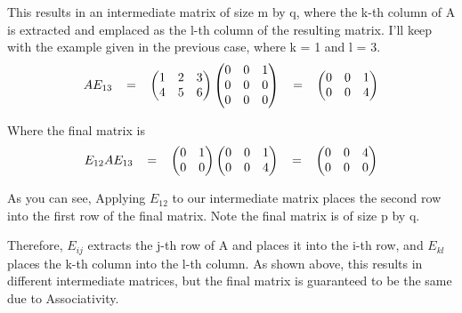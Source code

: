 \documentclass[12pt]{article}
\newcommand{\hop}{\vspace{1mm}}
\begin{document}
\begin{enumerate}[leftmargin=\labelsep]
\begin{enumerate}
\begin{enumerate}
    \hop
    This results in an intermediate matrix of size m by q, where the k-th column of A is extracted and emplaced as the l-th column of the resulting matrix. I'll keep with the example given in the previous case, where k = 1 and l = 3.
    \[
    AE_{13}
    \hspace{3mm}
    =
    \hspace{3mm}
    \begin{pmatrix}
        1   &2  &3  \\
        4   &5  &6
    \end{pmatrix}
    \begin{pmatrix}
        0   &0  &1  \\
        0   &0  &0  \\
        0   &0  &0
    \end{pmatrix}
    \hspace{3mm}
    =
    \hspace{3mm}
    \begin{pmatrix}
        0   &0  &1  \\
        0   &0  &4
    \end{pmatrix}
    \]

    \hop
    Where the final matrix is 
    \[
    E_{12}AE_{13}
    \hspace{3mm}
    =
    \hspace{3mm}
    \begin{pmatrix}
        0   &1  \\
        0   &0
    \end{pmatrix}
    \begin{pmatrix}
        0   &0  &1  \\
        0   &0  &4
    \end{pmatrix}
    \hspace{3mm}
    =
    \hspace{3mm}
    \begin{pmatrix}
        0   &0  &4  \\
        0   &0  &0
    \end{pmatrix}
    \]

    \hop
    As you can see, Applying $E_{12}$ to our intermediate matrix places the second row into the first row of the final matrix. Note the final matrix is of size p by q.
\end{enumerate}

\hop
Therefore, $E_{ij}$ extracts the j-th row of A and places it into the i-th row, and $E_{kl}$ places the k-th column into the l-th column. As shown above, this results in different intermediate matrices, but the final matrix is guaranteed to be the same due to Associativity.


\end{enumerate}
\end{enumerate}
\end{document}
